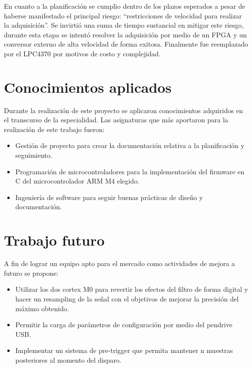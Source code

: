 En cuanto a la planificación se cumplio dentro de los plazos esperados a pesar de haberse manifestado el principal riesgo: “restricciones de velocidad para realizar la adquisición”. Se invirtió una suma de tiempo sustancial en mitigar este riesgo, durante esta etapa se intentó resolver la adquisición por medio de un FPGA y un conversor externo de alta velocidad de forma exitosa. Finalmente fue reemplazado por el LPC4370 por motivos de costo y complejidad.

\section{Conocimientos aplicados}

Durante la realización de este proyecto se aplicaron conocimientos adquiridos en el transcurso de la especialidad. Las asignaturas que más aportaron para la realización de este trabajo fueron:
\begin{itemize}
\item Gestión de proyecto para crear la documentación relativa a la planificación y seguimiento.
\item Programación de microcontroladores para la implementación del firmware en C del microcontrolador ARM M4 elegido.
\item Ingeniería de software para seguir buenas prácticas de diseño y documentación.
\end{itemize}

\section{Trabajo futuro}
A fin de lograr un equipo apto para el mercado como actividades de mejora a futuro se propone:
\begin{itemize}
\item Utilizar los dos cortex M0 para revertir los efectos del filtro de forma digital y hacer un resampling de la señal con el objetivos de mejorar la precisión del máximo obtenido.
\item Permitir la carga de parámetros de configuración por medio del pendrive USB. 
\item Implementar un sistema de pre-trigger que permita mantener n muestras posteriores al momento del disparo.
\end{itemize}
